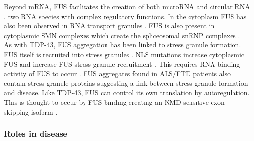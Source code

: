 Beyond mRNA, FUS facilitates the creation of both microRNA \citep{Morlando2012} and circular RNA \citep{Errichelli2017}, two RNA species with complex regulatory functions.
In the cytoplasm FUS has also been observed in RNA transport granules \citep{Kanai2004, Fujii2005}.
FUS is also present in cytoplasmic SMN complexes which create the spliceosomal snRNP complexes  \citep{Yamazaki2012,Groen2013}.
As with TDP-43, FUS aggregation has been linked to stress granule formation.
FUS itself is recruited into stress granules \citep{Andersson2008,Yasuda2013}. 
NLS mutations increase cytoplasmic FUS and increase FUS stress granule recruitment \citep{Dormann2010, Bosco2010}.
This requires RNA-binding activity of FUS to occur \citep{Daigle2013}	.
FUS aggregates found in ALS/FTD patients also contain stress granule proteins \citep{Dormann2010} suggesting a link between stress granule formation and disease.
Like TDP-43, FUS can control its own translation by autoregulation.
This is thought to occur by FUS binding creating an NMD-sensitive exon skipping isoform \citep{Zhou2013}.



\subsubsection{Roles in disease}

